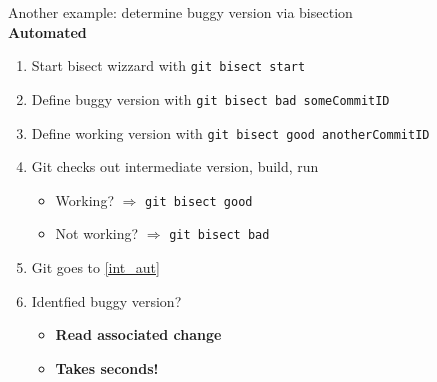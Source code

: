 \begin{frame}[fragile]
\emptyframetitle

Another example: determine buggy version via bisection\\[7pt]

\textbf{Automated}
\begin{enumerate}
  \item Start bisect wizzard with \texttt{git bisect start}
  \item Define buggy version with \texttt{git bisect bad someCommitID}
  \item Define working version with \texttt{git bisect good anotherCommitID}
  \item Git checks out intermediate version, build, run\label{int_aut}
  \begin{itemize}
    \normalsize
    \item Working? $\Rightarrow$ \texttt{git bisect good}
    \item Not working? $\Rightarrow$ \texttt{git bisect bad}
  \end{itemize}
  \item Git goes to \ref{int_aut}
  \item Identfied buggy version?
  \begin{itemize}
    \normalsize
    \item \textbf{Read associated change}
    \item \textbf{Takes seconds!}
  \end{itemize}
\end{enumerate}


\end{frame}

